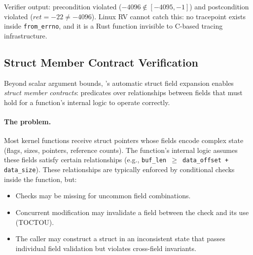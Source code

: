 \documentclass{article}
\begin{document}
\begin{center}
\end{center}

Verifier output: precondition violated ($-4096 \notin [-4095, -1]$) and
postcondition violated ($\mathit{ret} = -22 \neq -4096$). Linux RV cannot
catch this: no tracepoint exists inside \texttt{from\_errno}, and it is a Rust
function invisible to C-based tracing infrastructure.

\subsection{Struct Member Contract Verification}\label{sec:struct-contract}

Beyond scalar argument bounds, \toolname{}'s automatic struct field expansion
enables \emph{struct member contracts}: predicates over relationships between
fields that must hold for a function's internal logic to operate correctly.

\paragraph{The problem.} Most kernel functions receive struct pointers whose
fields encode complex state (flags, sizes, pointers, reference counts). The
function's internal logic assumes these fields satisfy certain relationships
(e.g., \texttt{buf\_len $\geq$ data\_offset + data\_size}). These
relationships are typically enforced by conditional checks inside the function,
but:
\begin{itemize}[nosep]
  \item Checks may be missing for uncommon field combinations.
  \item Concurrent modification may invalidate a field between the check and
        its use (TOCTOU).
  \item The caller may construct a struct in an inconsistent state that passes
        individual field validation but violates cross-field invariants.
\end{itemize}
\end{document}
